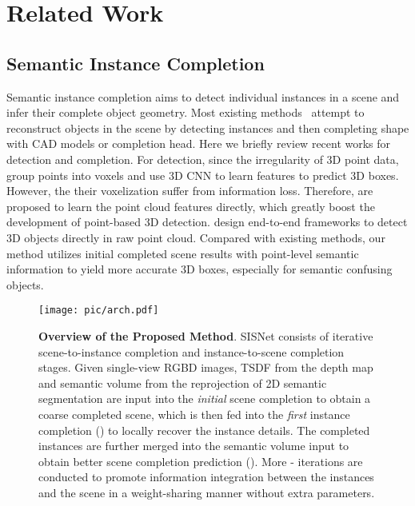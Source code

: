 \documentclass[final]{cvpr}
\begin{document}
\section{Related Work}
\vspace{-0.1cm}
\subsection{Semantic Instance Completion}
\vspace{-0.1cm}
Semantic instance completion aims to detect individual instances in a scene and infer their complete object geometry. Most existing methods~\cite{hou2020revealnet,hou2019sis,kundu20183d,avetisyan2020scenecad} attempt to reconstruct objects in the scene by detecting instances and then completing shape with CAD models or completion head. 
Here we briefly review recent works for detection and completion.
For detection, since the irregularity of 3D point data, \cite{song2016deep,zhou2018voxelnet} group points into voxels and use 3D CNN to learn features to predict 3D boxes. However, the their voxelization suffer from information loss. Therefore, \cite{qi2017pointnet,qi2017pointnet++} are proposed to learn the point cloud features directly, which greatly boost the development of point-based 3D detection. \cite{qi2019deep,yang20203dssd,shi2019points} design end-to-end frameworks to detect 3D objects directly in raw point cloud. 
Compared with existing methods, our method utilizes initial completed scene results with point-level semantic information to yield more accurate 3D boxes, especially for semantic confusing objects.
\begin{figure*}[t!]
\centering
\texttt{[image: pic/arch.pdf]}
\vspace{-4mm}
\caption{{\textbf{Overview of the Proposed Method}. SISNet consists of iterative scene-to-instance completion and instance-to-scene completion stages. Given single-view RGBD images, TSDF from the depth map and semantic volume from the reprojection of 2D semantic segmentation are input into the \textit{initial} scene completion  to obtain a coarse completed scene, which is then fed into the \textit{first} instance completion () to locally recover the instance details. The completed instances are further merged into the semantic volume input to obtain better scene completion prediction (). More - iterations are conducted to promote information integration between the instances and the scene in a weight-sharing manner without extra parameters.}}
\vspace{-0.5cm}
\label{fig:arch}
\end{figure*}
\end{document}

